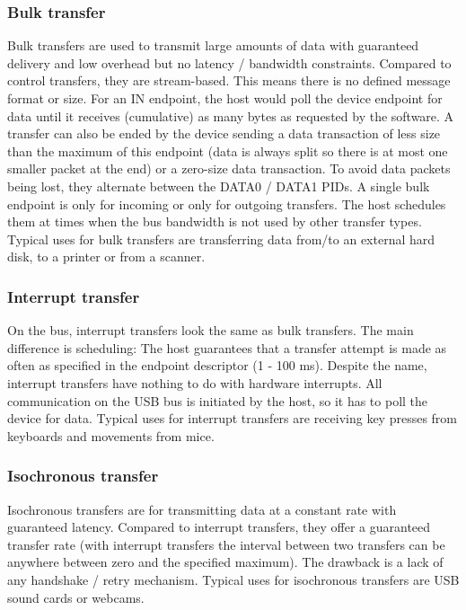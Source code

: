 \documentclass{article}
\begin{document}
\subsubsection {Bulk transfer}

Bulk transfers are used to transmit large amounts of data with guaranteed delivery
and low overhead but no latency / bandwidth constraints.
Compared to control transfers, they are stream-based. This means there is no defined message
format or size. For an IN endpoint, the host would poll the device endpoint for data until it receives
(cumulative) as many bytes as requested by the software. A transfer can also be ended by the device sending
a data transaction of less size than the maximum of this endpoint (data is always split so there is at most one
smaller packet at the end) or a zero-size data transaction. To avoid data packets being lost, they
alternate between the DATA0 / DATA1 PIDs. A single bulk endpoint is only for incoming
or only for outgoing transfers.
The host schedules them at times when the bus bandwidth is not used by other transfer types.
Typical uses for bulk transfers are transferring data from/to an external hard disk,
to a printer or from a scanner. \cite[p. 52ff.]{usbstd}

\subsubsection {Interrupt transfer}

On the bus, interrupt transfers look the same as bulk transfers.
The main difference is scheduling: The host guarantees that a transfer
attempt is made as often as specified in the endpoint descriptor (1 - 100 ms).
Despite the name, interrupt transfers have nothing to do with hardware interrupts.
All communication on the USB bus is initiated by the host, so it has to poll the device
for data.
Typical uses for interrupt transfers are receiving key presses from keyboards and
movements from mice. \cite[p. 48ff.]{usbstd}

\subsubsection {Isochronous transfer}

Isochronous transfers are for transmitting data at a constant rate with guaranteed
latency. Compared to interrupt transfers, they offer a guaranteed transfer rate
(with interrupt transfers the interval between two transfers can be anywhere
between zero and the specified maximum). The drawback is a lack of any handshake
/ retry mechanism.
Typical uses for isochronous transfers are USB sound cards or webcams.
\cite[p. 44ff.]{usbstd}
\end{document}

